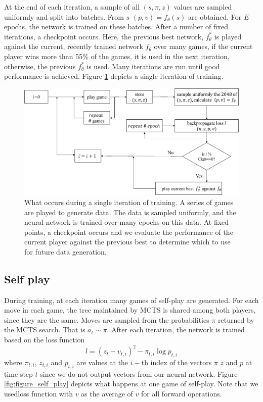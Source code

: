 \documentclass[english]{article}
\begin{document}
At the end of each iteration, a sample of all $(s, \pi, z)$ values are sampled
uniformly and split into batches. From $s$ $(p, v) = f_{\theta}(s)$ are
obtained. For $E$ epochs, the network is trained on these batches. After a
number of fixed iterations, a checkpoint occurs. Here, the previous best network,
$f_{\theta}^{\ast}$ is played against the current, recently trained network
$f_{\theta}$ over many games, if the current player wins more than 55\% of the
games, it is used in the next iteration, otherwise, the previous
$f_{\theta}^{\ast}$
is used. Many iterations are run until good performance is achieved. Figure
\ref{fig:figure_training} depicts a single iteration of training.


\begin{figure}[h]
\centering
\includegraphics[scale=0.2]{./images/training}
\caption{What occurs during a single iteration of training. A series of games
    are played to generate data. The data is sampled uniformly, and the neural
    network is trained over many epochs on this data. At fixed points, a
    checkpoint occurs and we evaluate the performance of the current player
    against the previous best to determine which to use for future data
    generation.}
\label{fig:figure_training}
\end{figure}

\subsection{Self play}
During training, at each iteration many games of self-play are generated. For
each move in each game, the tree maintained by MCTS is shared among both
players, since they are the same. Moves are sampled from the probabilities $\pi$
returned by the MCTS search. That is $a_t \sim \pi$. After each iteration, the
network is trained based on the loss function
\begin{equation}
    l=(z_t-v_{t,i})^2 - \pi_{t,i} \log p_{t,i}
    \label{eq:3}
\end{equation}
where $\pi_{t,i}$, $z_{t,i}$ and $p_{t,i}$ are values at the $i-$th index of the vectors
$\pi$ $z$ and $p$ at time step $t$ since we do not output vectors from our neural network.
Figure \ref{fig:figure_self_play} depicts what happens at one game of
self-play.
Note that we usedloss function with $v$ as the average of $v$
for all forward operations.
\end{document}
